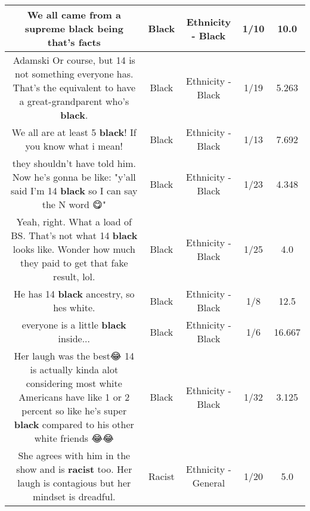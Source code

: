 \documentclass[11pt]{article}
\newlength\mylength
\begin{document}
\begin{center}
\begin{longtable}{|C{.65\mylength}|C{.30\mylength}|C{.12\mylength}|C{.12\mylength}|C{.12\mylength}|}
  \small We all came from a supreme \textbf{black} being  that's facts\normalsize   & Black & Ethnicity - Black & 1/10 & 10.0 \\  \hline
  \small Adamski Or course, but 14 is not something everyone has. That's the equivalent to have a great-grandparent who's \textbf{black}.\normalsize   & Black & Ethnicity - Black & 1/19 & 5.263 \\  \hline
  \small We all are at least 5 \textbf{black}! If you know what i mean!\normalsize   & Black & Ethnicity - Black & 1/13 & 7.692 \\  \hline
  \small they shouldn't have told him. Now he's gonna be like: "y'all said I'm 14 \textbf{black} so I can say the N word 😋"\normalsize   & Black & Ethnicity - Black & 1/23 & 4.348 \\  \hline
  \small Yeah, right. What a load of BS. That's not what 14 \textbf{black} looks like. Wonder how much they paid to get that fake result, lol.\normalsize   & Black & Ethnicity - Black & 1/25 & 4.0 \\  \hline
  \small He has 14 \textbf{black} ancestry, so hes white.\normalsize   & Black & Ethnicity - Black & 1/8 & 12.5 \\  \hline
  \small everyone is a little \textbf{black} inside...\normalsize   & Black & Ethnicity - Black & 1/6 & 16.667 \\  \hline
  \small Her laugh was the best😂 14 is actually kinda alot considering most white Americans have like 1 or 2 percent so like he's super \textbf{black} compared to his other white friends 😂😂\normalsize   & Black & Ethnicity - Black & 1/32 & 3.125 \\  \hline
  \small She agrees with him in the show and is \textbf{racist} too. Her laugh is contagious but her mindset is dreadful.\normalsize   & Racist & Ethnicity - General & 1/20 & 5.0 \\  \hline

\end{longtable}
\end{center}
\end{document}
